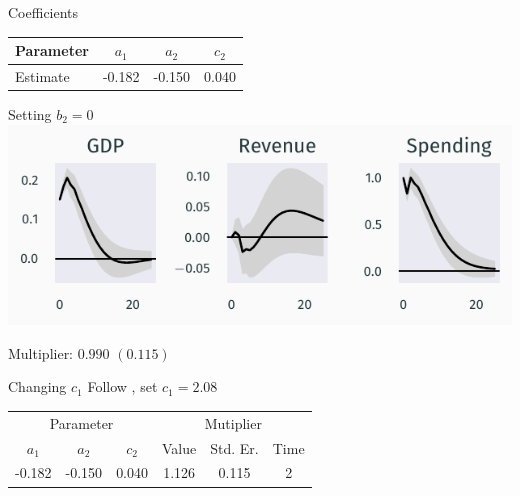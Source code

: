 \documentclass{beamer}
\begin{document}
\appendix


\begin{frame}{Coefficients} \label{frame:coefs}
    \centering
    \begin{tabular}{lccc}
        \toprule
        Parameter & $a_1$ & $a_2$ & $c_2$ \\
        \midrule
        Estimate & -0.182 & -0.150 & 0.040 \\
        \bottomrule
    \end{tabular}

    \hyperlink{frame:irfs}{}
\end{frame}


\begin{frame}{Setting $b_2 = 0$} \label{frame:b20}
    \centering
    \includegraphics{figures/b20_irf.pdf}

    Multiplier: $0.990$ $(0.115)$

    \hyperlink{frame:robust}{}
\end{frame}

\begin{frame}{Changing $c_1$} \label{frame:c1}
    Follow \textcite{blanchard2002empirical}, set $c_1 = 2.08$

    \begin{center}
        \begin{tabular}{cccccc}
            \toprule
            \multicolumn{3}{c}{Parameter} & \multicolumn{3}{c}{Mutiplier} \\
            \cmidrule(lr){1-3} \cmidrule(lr){4-6}
            $a_1$ & $a_2$ & $c_2$ & Value & Std. Er. & Time \\
            \midrule
            -0.182 & -0.150 & 0.040 & 1.126 & 0.115 & 2 \\
            \bottomrule
        \end{tabular}

        \hyperlink{frame:robust}{}
    \end{center}
\end{frame}
\end{document}
